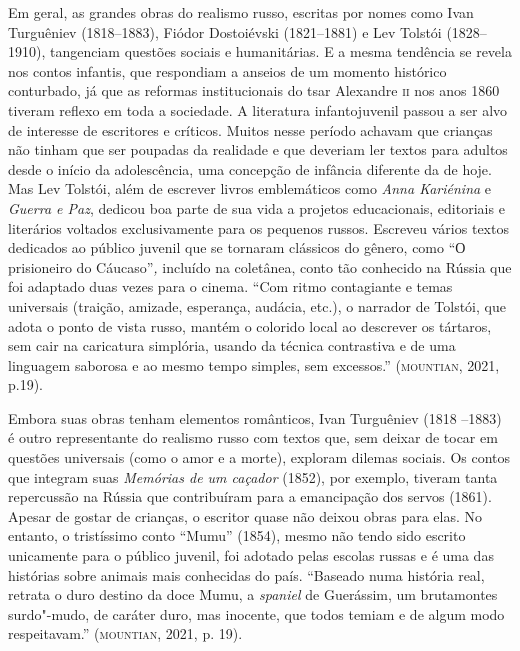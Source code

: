 \documentclass[11pt]{extarticle}
\begin{document}
Em geral, as grandes obras
do realismo russo, escritas por nomes como Ivan Turguêniev (1818--1883),
Fiódor Dostoiévski (1821--1881) e Lev Tolstói (1828--1910), tangenciam
questões sociais e humanitárias. E a mesma tendência se revela nos
contos infantis, que respondiam a anseios de um momento histórico
conturbado, já que as reformas institucionais do tsar Alexandre \textsc{ii} nos
anos 1860 tiveram reflexo em toda a sociedade. A literatura
infantojuvenil passou a ser alvo de interesse de escritores e críticos.
Muitos nesse período achavam que crianças não tinham que ser poupadas da
realidade e que deveriam ler textos para adultos desde o início da
adolescência, uma concepção de infância diferente da de hoje. Mas Lev
Tolstói, além de escrever livros emblemáticos como \emph{Anna Kariénina}
e \emph{Guerra e Paz}, dedicou boa parte de sua vida a projetos
educacionais, editoriais e literários voltados exclusivamente para os
pequenos russos. Escreveu vários textos dedicados ao público juvenil que
se tornaram clássicos do gênero, como ``О prisioneiro do
Cáucaso''\emph{,} incluído na coletânea, conto tão conhecido na Rússia
que foi adaptado duas vezes para o cinema. ``Com ritmo contagiante e
temas universais (traição, amizade, esperança, audácia, etc.), o
narrador de Tolstói, que adota o ponto de vista russo, mantém o colorido
local ao descrever os tártaros, sem cair na caricatura simplória, usando
da técnica contrastiva e de uma linguagem saborosa e ao mesmo tempo
simples, sem excessos.'' (\textsc{mountian}, 2021, p.19).

\begin{figure}[ht!]
\end{figure}

Embora suas obras tenham elementos românticos, Ivan Turguêniev (1818
--1883) é outro representante do realismo russo com textos que, sem
deixar de tocar em questões universais (como o amor e a morte), exploram
dilemas sociais. Os contos que integram suas \emph{Memórias de um
caçador} (1852), por exemplo, tiveram tanta repercussão na Rússia que
contribuíram para a emancipação dos servos (1861). Apesar de gostar de
crianças, o escritor quase não deixou obras para elas. No entanto, o
tristíssimo conto ``Mumu'' (1854), mesmo não tendo sido escrito
unicamente para o público juvenil, foi adotado pelas escolas russas e é
uma das histórias sobre animais mais conhecidas do país. ``Baseado numa
história real, retrata o duro destino da doce Mumu, a \emph{spaniel} de
Guerássim, um brutamontes surdo"-mudo, de caráter duro, mas inocente, que
todos temiam e de algum modo respeitavam.'' (\textsc{mountian}, 2021, p. 19).
\end{document}

